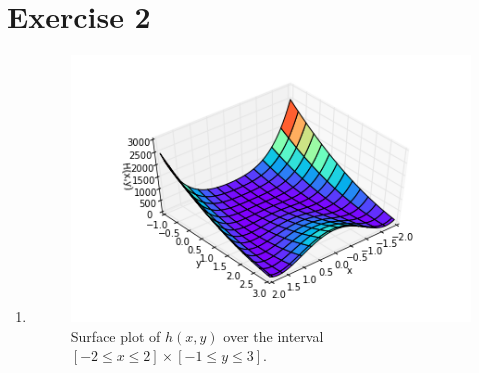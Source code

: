 \documentclass[a4paper,11pt]{article}
\theoremstyle{mytheor}
\begin{document}
\begin{enumerate}
\end{enumerate}

\pagebreak
\section*{Exercise 2}
\begin{enumerate}
	\item \begin{figure}[h!]
   			\centering
   			\includegraphics{surfaceplot.png}\vspace{-0.5cm}
   			\caption{\vspace{-0.2cm} Surface plot of $h(x,y)$ over the interval $[-2\leq x \leq 2] \times [-1 \leq y \leq 3]$.}
  		\end{figure}
 

\end{enumerate}
\end{document}
